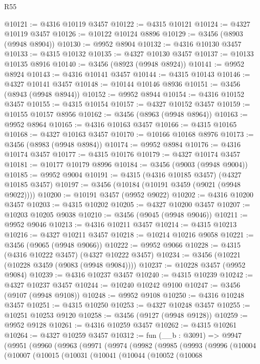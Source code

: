 \begin{lexlean}{R55}
\begin{coremodule}
@10121 := @4316 @10119 @3457
@10122 := @4315 @10121
@10124 := @4327 @10119 @3457
@10126 := @10122 @10124 @8896
@10129 := @3456 (@8903 (@9948 @8904))
@10130 := @9952 @8904
@10132 := @4316 @10130 @3457
@10133 := @4315 @10132
@10135 := @4327 @10130 @3457
@10137 := @10133 @10135 @8916
@10140 := @3456 (@8923 (@9948 @8924))
@10141 := @9952 @8924
@10143 := @4316 @10141 @3457
@10144 := @4315 @10143
@10146 := @4327 @10141 @3457
@10148 := @10144 @10146 @8936
@10151 := @3456 (@8943 (@9948 @8944))
@10152 := @9952 @8944
@10154 := @4316 @10152 @3457
@10155 := @4315 @10154
@10157 := @4327 @10152 @3457
@10159 := @10155 @10157 @8956
@10162 := @3456 (@8963 (@9948 @8964))
@10163 := @9952 @8964
@10165 := @4316 @10163 @3457
@10166 := @4315 @10165
@10168 := @4327 @10163 @3457
@10170 := @10166 @10168 @8976
@10173 := @3456 (@8983 (@9948 @8984))
@10174 := @9952 @8984
@10176 := @4316 @10174 @3457
@10177 := @4315 @10176
@10179 := @4327 @10174 @3457
@10181 := @10177 @10179 @8996
@10184 := @3456 (@9003 (@9948 @9004))
@10185 := @9952 @9004
@10191 := @4315 (@4316 @10185 @3457) (@4327 @10185 @3457)
@10197 := @3456 (@10184 (@10191 @3459 (@9021 (@9948 @9022))))
@10200 := @10191 @3457 (@9952 @9022)
@10202 := @4316 @10200 @3457
@10203 := @4315 @10202
@10205 := @4327 @10200 @3457
@10207 := @10203 @10205 @9038
@10210 := @3456 (@9045 (@9948 @9046))
@10211 := @9952 @9046
@10213 := @4316 @10211 @3457
@10214 := @4315 @10213
@10216 := @4327 @10211 @3457
@10218 := @10214 @10216 @9058
@10221 := @3456 (@9065 (@9948 @9066))
@10222 := @9952 @9066
@10228 := @4315 (@4316 @10222 @3457) (@4327 @10222 @3457)
@10234 := @3456 (@10221 (@10228 @3459 (@9083 (@9948 @9084))))
@10237 := @10228 @3457 (@9952 @9084)
@10239 := @4316 @10237 @3457
@10240 := @4315 @10239
@10242 := @4327 @10237 @3457
@10244 := @10240 @10242 @9100
@10247 := @3456 (@9107 (@9948 @9108))
@10248 := @9952 @9108
@10250 := @4316 @10248 @3457
@10251 := @4315 @10250
@10253 := @4327 @10248 @3457
@10255 := @10251 @10253 @9120
@10258 := @3456 (@9127 (@9948 @9128))
@10259 := @9952 @9128
@10261 := @4316 @10259 @3457
@10262 := @4315 @10261
@10264 := @4327 @10259 @3457
@10312 := fun (__b : @3091) =>
  @9947
    (@9951
      (@9960
        (@9963
          (@9971
            (@9974
              (@9982
                (@9985
                  (@9993
                    (@9996
                      (@10004
                        (@10007
                          (@10015
                            (@10031
                              (@10041
                                (@10044
                                  (@10052
                                    (@10068

\end{coremodule}
\end{lexlean}
